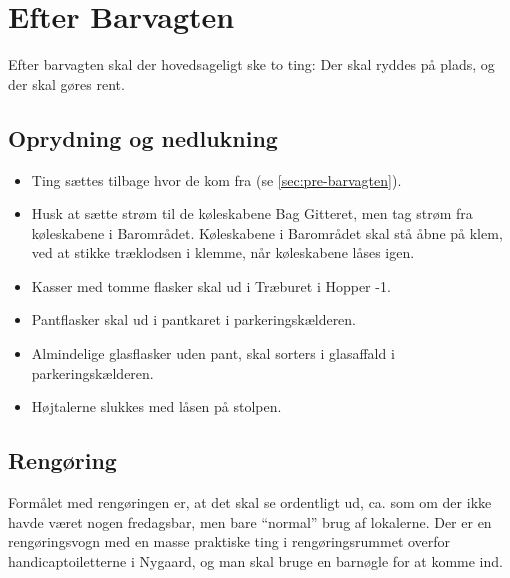 \section{Efter Barvagten}
\label{sec:post-barvagten}

Efter barvagten skal der hovedsageligt ske to ting: Der skal ryddes på
plads, og der skal gøres rent.

\subsection{Oprydning og nedlukning}
\label{sec:post:oprydning}

\begin{itemize}
	\item Ting sættes tilbage hvor de kom fra (se
	\autoref{sec:pre-barvagten}). 
	\item Husk at sætte strøm til de køleskabene Bag Gitteret, 
	men tag strøm fra køleskabene i Barområdet. 
	Køleskabene i Barområdet skal stå åbne på klem, 
	ved at stikke træklodsen i klemme, når køleskabene låses igen.
	\item Kasser med tomme flasker skal ud i Træburet i Hopper -1.
	\item Pantflasker skal ud i pantkaret i parkeringskælderen. 
	\item Almindelige glasflasker uden pant, skal sorters i glasaffald i parkeringskælderen.
	\item Højtalerne slukkes med låsen på stolpen.
\end{itemize}

\subsection{Rengøring}
\label{sec:post:rengoring}

Formålet med rengøringen er, at det skal se ordentligt ud, ca. som om
der ikke havde været nogen fredagsbar, men bare ``normal'' brug af
lokalerne. Der er en rengøringsvogn med en masse praktiske ting i
rengøringsrummet overfor handicaptoiletterne i Nygaard, 
og man skal bruge en barnøgle for at komme ind.

